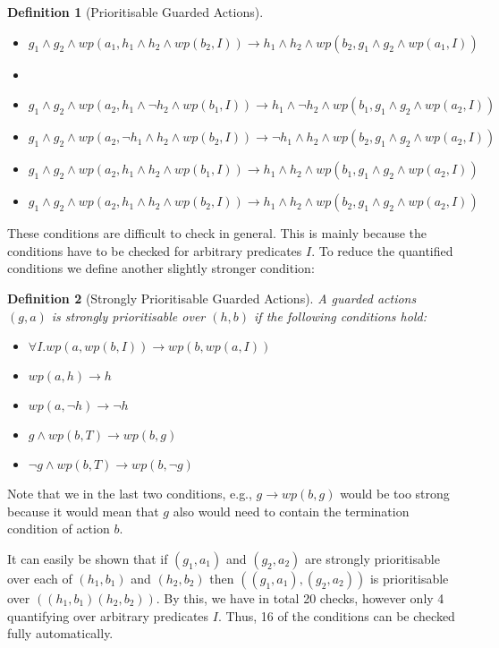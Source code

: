 \documentclass[11pt]{article}
\newtheorem{definition}{Definition}
\begin{document}
\begin{definition}[Prioritisable Guarded Actions]
\begin{itemize}
  \item $g_1 \land g_2 \land wp(a_1, h_1 \land h_2 \land wp(b_2,I)) \longrightarrow h_1 \land h_2 \land wp(b_2,g_1 \land g_2 \land wp(a_1,I))$
  \item[]
  \item $g_1 \land g_2 \land wp(a_2,h_1 \land \lnot h_2 \land wp(b_1,I)) \longrightarrow h_1 \land \lnot h_2 \land wp(b_1,g_1 \land g_2 \land wp(a_2,I))$ 
  \item $g_1 \land g_2 \land wp(a_2,\lnot h_1 \land h_2 \land wp(b_2,I)) \longrightarrow \lnot h_1 \land h_2 \land wp(b_2,g_1 \land g_2 \land wp(a_2,I))$
  \item $g_1 \land g_2 \land wp(a_2, h_1 \land h_2 \land wp(b_1,I)) \longrightarrow h_1 \land h_2 \land wp(b_1,g_1 \land g_2 \land wp(a_2,I))$
  \item $g_1 \land g_2 \land wp(a_2, h_1 \land h_2 \land wp(b_2,I)) \longrightarrow h_1 \land h_2 \land wp(b_2,g_1 \land g_2 \land wp(a_2,I))$
\end{itemize}
\label{def:prio}
\end{definition}

These conditions are difficult to check in general. This is mainly because the conditions have to be checked for arbitrary predicates $I$. To reduce the quantified conditions we define another slightly stronger condition:

\begin{definition}[Strongly Prioritisable Guarded Actions]
A guarded actions $(g,a)$ is strongly prioritisable over $(h,b)$ if the following conditions hold:
\begin{itemize}
  \item $\forall I. wp(a,wp(b,I)) \longrightarrow  wp(b,wp(a,I))$
  \item $wp(a, h) \longrightarrow h$
  \item $wp(a, \lnot h) \longrightarrow \lnot h$
  \item $g \land wp(b,T) \longrightarrow wp(b, g)$
  \item $\lnot g \land wp(b,T) \longrightarrow wp(b, \lnot g)$
\end{itemize}
\end{definition}

Note that we in the last two conditions, e.g., $g \longrightarrow wp(b,g)$ would be too strong because it would mean that $g$ also would need to contain the termination condition of action $b$. 

It can easily be shown that if $(g_1,a_1)$ and $(g_2,a_2)$ are strongly prioritisable over each of $(h_1,b_1)$ and $(h_2,b_2)$ then $((g_1,a_1),(g_2,a_2))$ is prioritisable over $((h_1,b_1)(h_2,b_2))$. By this, we have in total 20 checks, however only 4 quantifying over arbitrary predicates $I$. Thus, 16 of the conditions can be checked fully automatically.
\end{document}
